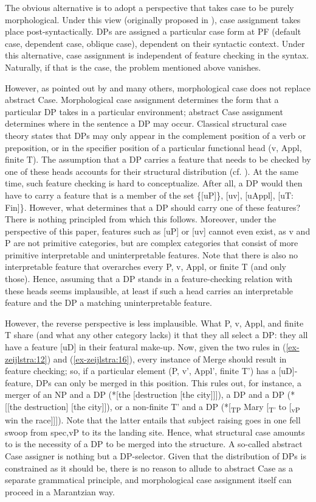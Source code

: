 \documentclass[output=paper
,modfonts
,nonflat]{langsci/langscibook}
\begin{document}
The obvious alternative is to adopt a perspective that takes case to be purely morphological. Under this view (originally proposed in \citealt{Marantz1991}), case assignment takes place post-syntactically. DPs are assigned a particular case form at PF (default case, dependent case, oblique case), dependent on their syntactic context. Under this alternative, case assignment is independent of feature checking in the syntax. Naturally, if that is the case, the problem mentioned above vanishes.

However, as pointed out by \citet{Legate2008} and many others, morphological case does not replace abstract Case. Morphological case assignment determines the form that a particular DP takes in a particular environment; abstract Case assignment determines where in the sentence a DP may occur. Classical structural case theory states that DPs may only appear in the complement position of a verb or preposition, or in the specifier position of a particular functional head (v, Appl, finite T). The assumption that a DP carries a feature that needs to be checked by one of these heads accounts for their structural distribution (cf. \citealt{Chomsky1995, Chomsky2001}). At the same time, such feature checking is hard to conceptualize. After all, a DP would then have to carry a feature that is a member of the set \{[uP]\}, [uv], [uAppl], [uT: Fin]\}. However, what determines that a DP should carry one of these features? There is nothing principled from which this follows. Moreover, under the perspective of this paper, features such as [uP] or [uv] cannot even exist, as v and P are not primitive categories, but are complex categories that consist of more primitive interpretable and uninterpretable features. Note that there is also no interpretable feature that overarches every P, v, Appl, or finite T (and only those). Hence, assuming that a DP stands in a feature-checking relation with these heads seems implausible, at least if such a head carries an interpretable feature and the DP a matching uninterpretable feature.

However, the reverse perspective is less implausible. What P, v, Appl, and finite T share (and what any other category lacks) it that they all select a DP: they all have a feature [uD] in their featural make-up. Now, given the two rules in (\ref{ex-zeijlstra:12}) and (\ref{ex-zeijlstra:16}), every instance of Merge should result in feature checking; so, if a particular element (P, v’, Appl’, finite T’) has a [uD]-feature, DPs can only be merged in this position. This rules out, for instance, a merger of an NP and a DP (*[the [destruction [the city]]]), a DP and a DP (*[[the destruction] [the city]]), or a non-finite T’ and a DP (*[\textsubscript{TP} Mary [\textsubscript{T’} to [\textsubscript{vP} win the race]]]). Note that the latter entails that subject raising goes in one fell swoop from spec,vP to its the landing site. Hence, what structural case amounts to is the necessity of a DP to be merged into the structure. A so-called abstract Case assigner is nothing but a DP-selector. Given that the distribution of DPs is constrained as it should be, there is no reason to allude to abstract Case as a separate grammatical principle, and morphological case assignment itself can proceed in a Marantzian way.
\end{document}
